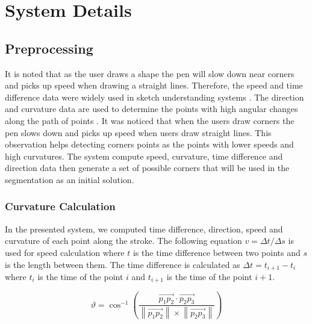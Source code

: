 
\chapter{System Details}
\label{sec:SystemDetails}


\section{Preprocessing}
\label{sec:Preprocessing}
 It is noted that as the user draws a shape the pen will slow down near corners and picks up speed when drawing a straight lines. Therefore, the speed and time difference data were widely used in sketch understanding systems \cite{earlyprocess}.  The direction and curvature data are used to determine the points with high angular changes along the path of points \cite{meanshift10}.
 It was noticed that when the users draw  corners the pen slows down and picks up speed when users draw straight lines. This observation helps detecting corners points as the points with lower speeds and high curvatures. The system compute speed, curvature, time difference and direction data then generate a set of possible corners that will be used in the segmentation as an initial solution. 
 
\subsection{Curvature Calculation}
\label{sec:CurvatureCalculation}
  
 
 In the presented system, we computed time difference, direction, speed and curvature of each point along the stroke. The following equation $v=\Delta t/\Delta s$ is used for speed calculation  where $t$ is the time difference between two points and $s$ is the length between them. The time difference is calculated as $\Delta t = t_{i+1} - t_i$ where $t_i$ is the time of the point $i$ and $t_{i+1}$ is the time of the point $i+1$. 
 
\begin{equation}
\label{eq:direction}
	\vartheta  = \cos ^{ - 1} \left( {\frac{{\overrightarrow {p_1 p_2 }  \cdot \overrightarrow {p_2 p_3 } }}{{\left\| {\overrightarrow {p_1 p_2 } } \right\| \times \left\| {\overrightarrow {p_2 p_3 } } \right\|}}} \right)
\end{equation}



